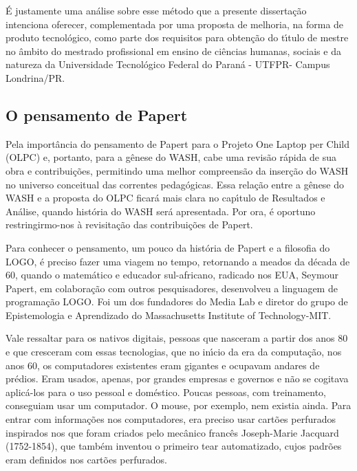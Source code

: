 \documentclass[
12pt,		%
openright,	%
twoside,  %
a4paper,			%
chapter=TITLE,		%
english,			%
french,				%
spanish,			%
brazil				%
]{USPSC-classe/USPSC}
\begin{document}
\'E justamente uma an\'alise sobre esse m\'etodo que a presente disserta\c{c}\~ao intenciona oferecer, complementada por uma proposta de melhoria, na forma de produto tecnol\'ogico, como parte dos requisitos para obten\c{c}\~ao do t\'{\i}tulo de mestre no \^ambito do mestrado profissional em ensino de ci\^encias humanas, sociais e da natureza da Universidade  Tecnol\'ogico  Federal do Paran\'a - UTFPR- Campus Londrina/PR.









\subsection[O pensamento de Papert]{O pensamento de Papert}\label{O pensamento de Papert}
Pela import\^ancia do pensamento de Papert para o Projeto One Laptop per Child (OLPC) e, portanto, para a g\^enese do WASH, cabe uma revis\~ao r\'apida de sua obra e contribui\c{c}\~oes, permitindo uma melhor compreens\~ao da inser\c{c}\~ao do WASH no universo conceitual das correntes pedag\'ogicas. Essa rela\c{c}\~ao entre a g\^enese do WASH e a proposta do OLPC ficar\'a mais clara no cap\'{\i}tulo de Resultados e An\'alise, quando hist\'oria do WASH ser\'a apresentada. Por ora, \'e oportuno restringirmo-nos \`a revisita\c{c}\~ao das contribui\c{c}\~oes de Papert.









Para conhecer  o pensamento, um pouco da hist\'oria de Papert e  a filosofia do LOGO, \'e preciso fazer uma viagem no tempo, retornando a meados da d\'ecada de 60, quando o matem\'atico e educador sul-africano, radicado nos EUA, Seymour Papert, em colabora\c{c}\~ao com outros pesquisadores, desenvolveu a linguagem  de programa\c{c}\~ao LOGO.  Foi um dos fundadores do Media Lab e diretor do grupo de Epistemologia e Aprendizado do Massachusetts Institute of Technology-MIT.









Vale ressaltar para os nativos digitais, pessoas que nasceram a partir dos anos 80 e que cresceram com essas tecnologias, que no in\'{\i}cio da era da computa\c{c}\~ao, nos anos 60, os computadores existentes eram gigantes e ocupavam andares de pr\'edios. Eram usados, apenas, por grandes empresas e governos e n\~ao se cogitava aplic\'a-los para o uso pessoal e dom\'estico. Poucas pessoas, com treinamento, conseguiam usar um computador. O mouse, por exemplo, nem existia ainda. Para entrar com informa\c{c}\~oes nos computadores, era preciso usar cart\~oes perfurados inspirados nos que foram criados pelo mec\^anico franc\^es Joseph-Marie Jacquard (1752-1854), que tamb\'em inventou o primeiro tear automatizado, cujos padr\~oes eram definidos nos cart\~oes perfurados.
\end{document}

